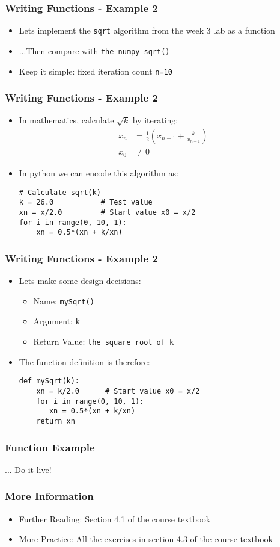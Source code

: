 \documentclass[english,14pt]{beamer}
\begin{document}
\begin{frame}[fragile]
\frametitle{Writing Functions - Example 2}
\begin{itemize}
\item Lets implement the \texttt{sqrt} algorithm from the week 3 lab as a function
\item ...Then compare with \texttt{the numpy sqrt()}
\item Keep it simple: fixed iteration count \texttt{n=10}
\end{itemize}
\end{frame}
\begin{frame}[fragile]
\frametitle{Writing Functions - Example 2}
\begin{itemize}
\item In mathematics, calculate $\sqrt{k}$ by iterating:
\begin{align*}
x_n &= \frac{1}{2}\left(x_{n-1} + \frac{k}{x_{n-1}}\right)\\
x_0 &\neq 0
\end{align*}
\item In python we can encode this algorithm as:  
\begin{lstlisting}[style=CStyle]
# Calculate sqrt(k)
k = 26.0           # Test value
xn = x/2.0         # Start value x0 = x/2
for i in range(0, 10, 1):
	xn = 0.5*(xn + k/xn)
\end{lstlisting}
\end{itemize}
\end{frame}
\begin{frame}[fragile]
\frametitle{Writing Functions - Example 2}
\begin{itemize}
\item Lets make some design decisions:
	\begin{itemize}
		\item Name: \texttt{mySqrt()}
		\item Argument: \texttt{k}
		\item Return Value: \texttt{the square root of k}
	\end{itemize}
\item The function definition is therefore:
\begin{lstlisting}[style=CStyle]
def mySqrt(k):
	xn = k/2.0      # Start value x0 = x/2
    for i in range(0, 10, 1):
	   xn = 0.5*(xn + k/xn)
	return xn
\end{lstlisting}
\end{itemize}
\end{frame}

\begin{frame}
\frametitle{Function Example}
\begin{center}
... Do it live!
\end{center}
\end{frame}

\begin{frame}
\frametitle{More Information}
\begin{center}
	\begin{itemize}
		\item Further Reading: Section 4.1 of the course textbook
        \item More Practice: All the exercises in section 4.3 of the course textbook  
    \end{itemize}
\end{center}
\end{frame}
\end{document}
